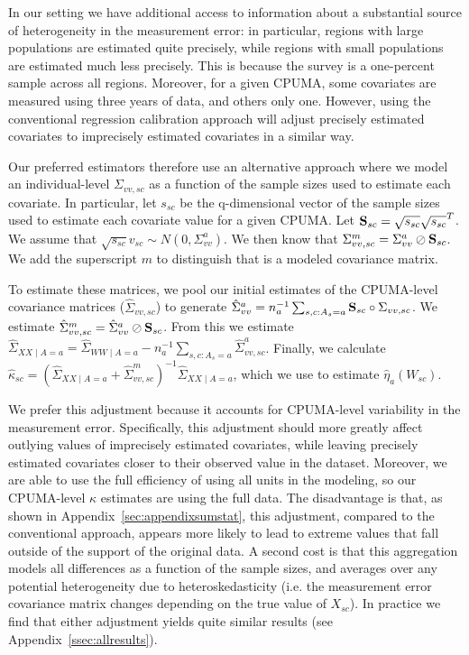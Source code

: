 In our setting we have additional access to information about a substantial source of heterogeneity in the measurement error: in particular, regions with large populations are estimated quite precisely, while regions with small populations are estimated much less precisely. This is because the survey is a one-percent sample across all regions. Moreover, for a given CPUMA, some covariates are measured using three years of data, and others only one. However, using the conventional regression calibration approach will adjust precisely estimated covariates to imprecisely estimated covariates in a similar way. 

Our preferred estimators therefore use an alternative approach where we model an individual-level $\Sigma_{vv, sc}$ as a function of the sample sizes used to estimate each covariate. In particular, let $s_{sc}$ be the q-dimensional vector of the sample sizes used to estimate each covariate value for a given CPUMA. Let $\mathbf{S}_{sc} = \sqrt{s_{sc}}\sqrt{s_{sc}}^T$. We assume that $\sqrt{s_{sc}}v_{sc} \sim N(0, \Sigma_{vv}^a)$. We then know that $\Sigma_{vv, sc}^m = \Sigma_{vv}^a \oslash \mathbf{S}_{sc}$. We add the superscript $m$ to distinguish that is a modeled covariance matrix.

To estimate these matrices, we pool our initial estimates of the CPUMA-level covariance matrices ($\hat{\Sigma}_{vv, sc}$) to generate $\hat{\Sigma}_{vv}^a = n_a^{-1}\sum_{s, c: A_s = a} \mathbf{S}_{sc} \circ \Sigma_{vv, sc}$. We estimate $\hat{\Sigma}_{vv, sc}^m = \hat{\Sigma}_{vv}^a \oslash \mathbf{S}_{sc}$. From this we estimate $\hat{\Sigma}_{XX \mid A = a} = \hat{\Sigma}_{WW \mid A = a} - n_a^{-1}\sum_{s, c: A_s = a}\hat{\Sigma}_{vv, sc}^a$. Finally, we calculate $\hat{\kappa}_{sc} = (\hat{\Sigma}_{XX \mid A = a} + \hat{\Sigma}_{vv, sc}^m)^{-1}\hat{\Sigma}_{XX \mid A = a}$, which we use to estimate $\hat{\eta}_a(W_{sc})$. 

We prefer this adjustment because it accounts for CPUMA-level variability in the measurement error. Specifically, this adjustment should more greatly affect outlying values of imprecisely estimated covariates, while leaving precisely estimated covariates closer to their observed value in the dataset. Moreover, we are able to use the full efficiency of using all units in the modeling, so our CPUMA-level $\kappa$ estimates are using the full data. The disadvantage is that, as shown in Appendix~\ref{sec:appendixsumstat}, this adjustment, compared to the conventional approach, appears more likely to lead to extreme values that fall outside of the support of the original data. A second cost is that this aggregation models all differences as a function of the sample sizes, and averages over any potential heterogeneity due to heteroskedasticity (i.e. the measurement error covariance matrix changes depending on the true value of $X_{sc}$). In practice we find that either adjustment yields quite similar results (see Appendix~\ref{ssec:allresults}).
